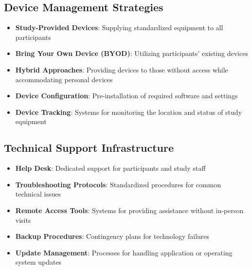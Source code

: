 \subsection{Device Management Strategies}
\begin{itemize}
    \item \textbf{Study-Provided Devices}: Supplying standardized equipment to all participants
    
    \item \textbf{Bring Your Own Device (BYOD)}: Utilizing participants' existing devices
    
    \item \textbf{Hybrid Approaches}: Providing devices to those without access while accommodating personal devices
    
    \item \textbf{Device Configuration}: Pre-installation of required software and settings
    
    \item \textbf{Device Tracking}: Systems for monitoring the location and status of study equipment
\end{itemize}

\subsection{Technical Support Infrastructure}
\begin{itemize}
    \item \textbf{Help Desk}: Dedicated support for participants and study staff
    
    \item \textbf{Troubleshooting Protocols}: Standardized procedures for common technical issues
    
    \item \textbf{Remote Access Tools}: Systems for providing assistance without in-person visits
    
    \item \textbf{Backup Procedures}: Contingency plans for technology failures
    
    \item \textbf{Update Management}: Processes for handling application or operating system updates
\end{itemize}

